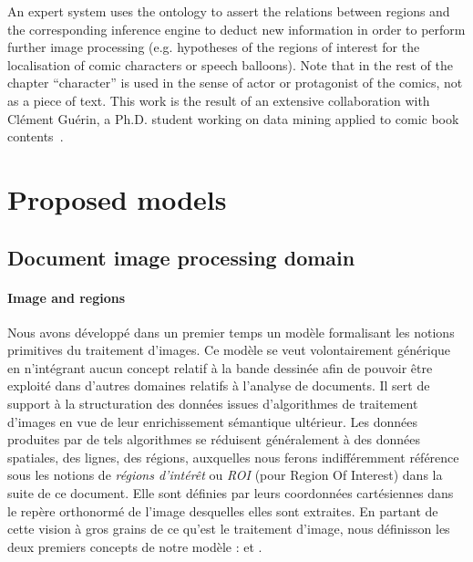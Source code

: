 
An expert system uses the ontology to assert the relations between regions and the corresponding inference engine to deduct new information in order to perform further image processing (e.g. hypotheses of the regions of interest for the localisation of comic characters or speech balloons).
Note that in the rest of the chapter ``character'' is used in the sense of actor or protagonist of the comics, not as a piece of text.
This work is the result of an extensive collaboration with Cl{\'e}ment Gu{\'e}rin, a Ph.D. student working on data mining applied to comic book contents~\cite{phdthesisGuerin14}.

\section{Proposed models} %
\label{sec:proposed_models}
\subsection{Document image processing domain} %
\label{sub:document_image_processing_domain}

\paragraph{Image and regions} %
\label{par:image}
Nous avons développé dans un premier temps un modèle formalisant les notions primitives du traitement d'images.
Ce modèle se veut volontairement générique en n'intégrant aucun concept relatif à la bande dessinée afin de pouvoir être exploité dans d'autres domaines relatifs à l'analyse de documents.
Il sert de support à la structuration des données issues d'algorithmes de traitement d'images en vue de leur enrichissement sémantique ultérieur.
Les données produites par de tels algorithmes se réduisent généralement à des données spatiales, des lignes, des régions, auxquelles nous ferons indifféremment référence sous les notions de \textit{régions d'intérêt} ou \textit{ROI} (pour Region Of Interest) dans la suite de ce document.
Elle sont définies par leurs coordonnées cartésiennes dans le repère orthonormé de l'image desquelles elles sont extraites. En partant de cette vision à gros grains de ce qu'est le traitement d'image, nous définisson les deux premiers concepts de notre modèle :  et .\\

